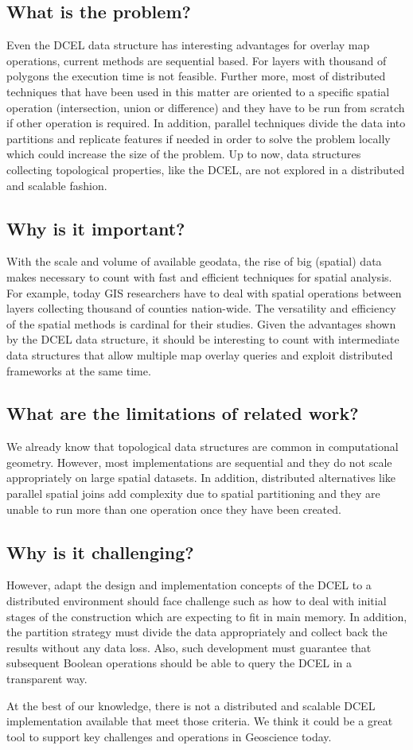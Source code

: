 \subsection{What is the problem?}
Even the DCEL data structure has interesting advantages for overlay map operations, current methods are sequential based.  For layers with thousand of polygons the execution time is not feasible.  Further more, most of distributed techniques that have been used in this matter are oriented to a specific spatial operation (intersection, union or difference) and they have to be run from scratch if other operation is required.  In addition, parallel techniques divide the data into partitions and replicate features if needed in order to solve the problem locally which could increase the size of the problem.  Up to now, data structures collecting topological properties, like the DCEL, are not explored in a distributed and scalable fashion.

\subsection{Why is it important?}
With the scale and volume of available geodata, the rise of big (spatial) data makes necessary to count with fast and efficient techniques for spatial analysis.  For example, today GIS researchers have to deal with spatial operations between layers collecting thousand of counties nation-wide.  The versatility and efficiency of the spatial methods is cardinal for their studies. Given the advantages shown by the DCEL data structure, it should be interesting to count with intermediate data structures that allow multiple map overlay queries and exploit distributed frameworks at the same time. 

\subsection{What are the limitations of related work?}
We already know that topological data structures are common in computational geometry.  However, most implementations are sequential and they do not scale appropriately on large spatial datasets.  In addition, distributed alternatives like parallel spatial joins add complexity due to spatial partitioning and they are unable to run more than one operation once they have been created.

\subsection{Why is it challenging?}
However, adapt the design and implementation concepts of the DCEL to a distributed environment should face challenge such as how to deal with initial stages of the construction which are expecting to fit in main memory.  In addition, the partition strategy must divide the data appropriately and collect back the results without any data loss.  Also, such development must guarantee that subsequent Boolean operations should be able to query the DCEL in a transparent way.

At the best of our knowledge, there is not a distributed and scalable DCEL implementation available that meet those criteria.  We think it could be a great tool to support key  challenges and operations in Geoscience today.  

